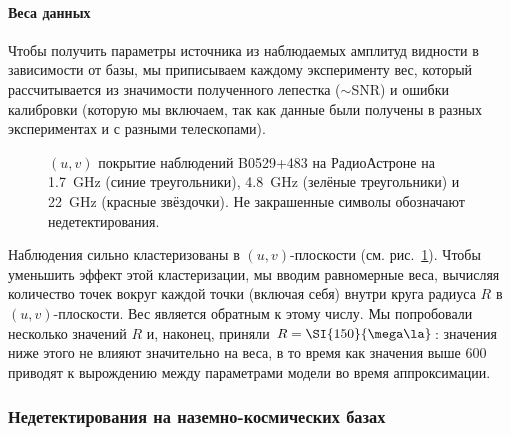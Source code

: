 \paragraph{Веса данных}

Чтобы получить параметры источника из наблюдаемых амплитуд видности в зависимости от базы, мы
приписываем каждому эксперименту вес, который рассчитывается из значимости полученного лепестка
($\sim$SNR) и ошибки калибровки (которую мы включаем, так как данные были получены в разных
экспериментах и с разными телескопами).

\begin{figure}[tbh]
\caption{$(u, v)$ покрытие наблюдений B0529+483 на РадиоАстроне на \SI{1.7}{\GHz} (синие
треугольники), \SI{4.8}{\GHz} (зелёные треугольники) и \SI{22}{\GHz} (красные звёздочки).
Не закрашенные символы обозначают недетектирования.}
\label{fig:0529_uv}
\end{figure}

Наблюдения сильно кластеризованы в $(u, v)$-плоскости (см. рис.~\ref{fig:0529_uv}). Чтобы уменьшить
эффект этой кластеризации, мы вводим равномерные веса, вычисляя количество точек вокруг каждой точки
(включая себя) внутри круга радиуса $R$ в $(u, v)$-плоскости. Вес является обратным к этому числу.
Мы попробовали несколько значений $R$ и, наконец, приняли $R = \SI{150}{\mega\la}$: значения ниже
этого не влияют значительно на веса, в то время как значения выше \SI{600}{\mega\la} приводят к
вырождению между параметрами модели во время аппроксимации.


\subsubsection{Недетектирования на наземно-космических базах}

